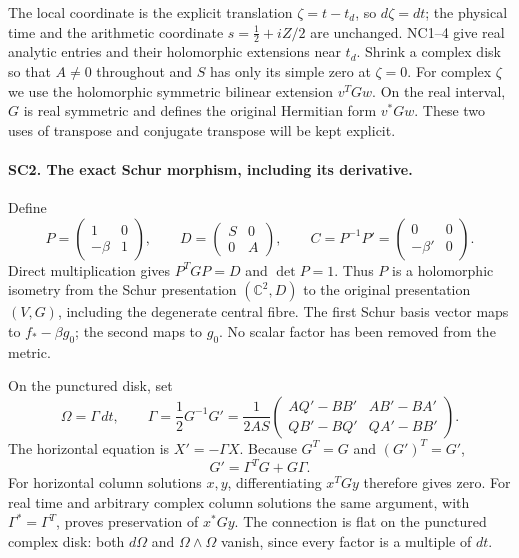 \documentclass[11pt,a4paper]{article}
\theoremstyle{definition}\newtheorem{definition}[theorem]{Definition}
\begin{document}
The local coordinate is the explicit translation
\(\zeta=t-t_d\), so \(d\zeta=dt\); the physical time and the
arithmetic coordinate \(s=\frac12+iZ/2\) are unchanged.
NC1--4 give real analytic entries and their holomorphic extensions
near \(t_d\). Shrink a complex disk so that \(A\ne0\) throughout
and \(S\) has only its simple zero at \(\zeta=0\).
For complex \(\zeta\) we use the holomorphic symmetric bilinear
extension \(v^TGw\). On the real interval, \(G\) is real symmetric
and defines the original Hermitian form \(v^*Gw\). These two uses
of transpose and conjugate transpose will be kept explicit.

\paragraph{SC2. The exact Schur morphism, including its derivative.}
Define
\[
 P=\begin{pmatrix}1&0\\-\beta&1\end{pmatrix},\qquad
 D=\begin{pmatrix}S&0\\0&A\end{pmatrix},\qquad
 C=P^{-1}P'=\begin{pmatrix}0&0\\-\beta'&0\end{pmatrix}.
 \tag{SC6}
\]
Direct multiplication gives \(P^TGP=D\) and \(\det P=1\).
Thus \(P\) is a holomorphic isometry from the Schur presentation
\((\mathbb C^2,D)\) to the original presentation
\((V,G)\), including the degenerate central fibre. The first
Schur basis vector maps to \(f_*-\beta g_0\); the second maps to
\(g_0\). No scalar factor has been removed from the metric.

On the punctured disk, set
\[
 \Omega=\Gamma\,dt,\qquad
 \Gamma=\frac12G^{-1}G'
 =\frac1{2AS}
 \begin{pmatrix}
 A Q'-B B'&A B'-B A'\\
 Q B'-B Q'&Q A'-B B'
 \end{pmatrix}.
 \tag{SC7}
\]
The horizontal equation is \(X'=-\Gamma X\).
Because \(G^T=G\) and \((G')^T=G'\),
\[
 G'=\Gamma^TG+G\Gamma.
 \tag{SC8}
\]
For horizontal column solutions \(x,y\), differentiating
\(x^TGy\) therefore gives zero. For real time and arbitrary complex
column solutions the same argument, with \(\Gamma^*=\Gamma^T\),
proves preservation of \(x^*Gy\). The connection is flat on the
punctured complex disk: both \(d\Omega\) and
\(\Omega\wedge\Omega\) vanish, since every factor is a multiple
of \(dt\).
\end{document}
